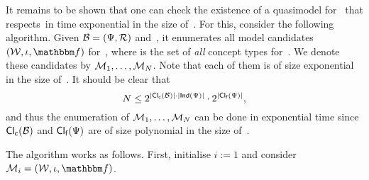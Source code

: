\noindent
It remains to be shown that one can check the existence of a quasimodel for~\Bmc
that respects~\Dmc in time exponential in the size of~\Bmc.  For this, consider
the following algorithm.
%
Given $\mathcal{B}=(\Psi,\mathcal{R})$ and~\Dmc, it enumerates all model
candidates $(\Wmc,\iota,\fbb)$ for~\Bmc, where \Wmc is the set of \emph{all}
concept types for~\Bmc.  We denote these candidates by $\mathcal{M}_1,\dots,\mathcal{M}_N$.
Note that each of them is of size exponential in the size of~\Bmc.  It should be
clear that
\[N\le 2^{\lvert\operatorname{\mathsf{Cl_c}}(\mathcal{B})\rvert\cdot\lvert\mathsf{Ind}(\Psi)\rvert}\cdot
    2^{\lvert\operatorname{\mathsf{Cl_f}}(\Psi)\rvert},\]
and thus the enumeration of $\mathcal{M}_1,\dots,\mathcal{M}_N$ can be done in exponential
time since $\operatorname{\mathsf{Cl_c}}(\mathcal{B})$ and $\operatorname{\mathsf{Cl_f}}(\Psi)$ are of size polynomial in the size
of~\Bmc.

The algorithm works as follows.  First, initialise $i:=1$ and consider
$\Mmc_i=(\Wmc,\iota,\fbb)$.
